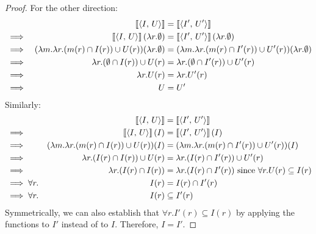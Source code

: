 \begin{proof}
For the other direction:
\begin{align*}
&&
    \left\llbracket\left\langle I,\,U\right\rangle\right\rrbracket &= \left\llbracket\left\langle I',\,U'\right\rangle\right\rrbracket\\
&\implies &
    \left\llbracket\left\langle I,\,U\right\rangle\right\rrbracket(\lambda r. \emptyset) &= \left\llbracket\left\langle I',\,U'\right\rangle\right\rrbracket(\lambda r. \emptyset)\\
&\implies &
(\lambda m.\lambda r.(m(r)\cap I(r))\cup U(r))(\lambda r.\emptyset) &=
(\lambda m.\lambda r.(m(r)\cap I'(r))\cup U'(r))(\lambda r.\emptyset) \\
&\implies &
\lambda r.(\emptyset \cap I(r))\cup U(r) &=
\lambda r.(\emptyset \cap I'(r))\cup U'(r) \\
&\implies &
\lambda r.U(r) &=
\lambda r.U'(r) \\
&\implies &
U &=
U' \\
\end{align*}
Similarly:
\begin{align*}
&&
    \left\llbracket\left\langle I,\,U\right\rangle\right\rrbracket &= \left\llbracket\left\langle I',\,U'\right\rangle\right\rrbracket\\
&\implies &
\left\llbracket\left\langle I,\,U\right\rangle\right\rrbracket(I) &= \left\llbracket\left\langle I',\,U'\right\rangle\right\rrbracket(I)\\
&\implies &
(\lambda m.\lambda r.(m(r)\cap I(r))\cup U(r))(I) &=
(\lambda m.\lambda r.(m(r)\cap I'(r))\cup U'(r))(I) \\
&\implies &
\lambda r.(I(r) \cap I(r))\cup U(r) &=
\lambda r.(I(r) \cap I'(r))\cup U'(r) \\
&\implies &
\lambda r.(I(r) \cap I(r)) &=
\lambda r.(I(r) \cap I'(r)) \textrm{ since $\forall r.U(r) \subseteq I(r)$} \\
&\implies \forall r.&
I(r) &= I(r) \cap I'(r)\\
&\implies \forall r.&
I(r) &\subseteq I'(r)\\
\end{align*}
Symmetrically, we can also establish that $\forall r.I'(r) \subseteq I(r)$ by applying the functions to $I'$ instead of to $I$. Therefore, $I = I'$.
\end{proof}

